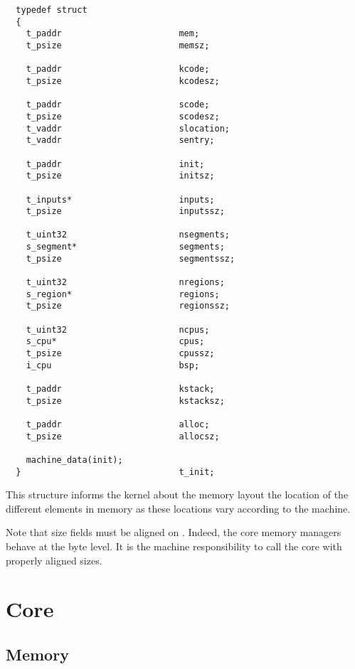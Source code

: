 \begin{verbatim}
  typedef struct
  {
    t_paddr                       mem;
    t_psize                       memsz;

    t_paddr                       kcode;
    t_psize                       kcodesz;

    t_paddr                       scode;
    t_psize                       scodesz;
    t_vaddr                       slocation;
    t_vaddr                       sentry;

    t_paddr                       init;
    t_psize                       initsz;

    t_inputs*                     inputs;
    t_psize                       inputssz;

    t_uint32                      nsegments;
    s_segment*                    segments;
    t_psize                       segmentssz;

    t_uint32                      nregions;
    s_region*                     regions;
    t_psize                       regionssz;

    t_uint32                      ncpus;
    s_cpu*                        cpus;
    t_psize                       cpussz;
    i_cpu                         bsp;

    t_paddr                       kstack;
    t_psize                       kstacksz;

    t_paddr                       alloc;
    t_psize                       allocsz;

    machine_data(init);
  }                               t_init;
\end{verbatim}

This structure informs the kernel about the memory layout \ie{} the location
of the different elements in memory as these locations vary according to
the machine.

Note that size fields must be aligned on . Indeed, the
core memory managers behave at the byte level. It is the machine responsibility
to call the core with properly aligned sizes.

%
%

\section{Core}


\subsection*{Memory}

